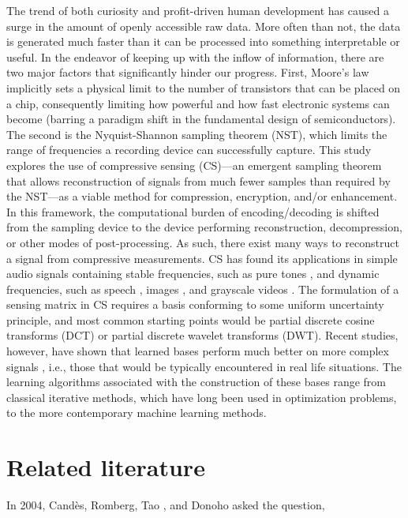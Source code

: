 The trend of both curiosity and profit-driven human development has caused a surge in the amount of openly accessible raw data. More often than not, the data is generated much faster than it can be processed into something interpretable or useful. In the endeavor of keeping up with the inflow of information, there are two major factors that significantly hinder our progress. First, Moore's law implicitly sets a physical limit to the number of transistors that can be placed on a chip, consequently limiting how powerful and how fast electronic systems can become (barring a paradigm shift in the fundamental design of semiconductors). The second is the Nyquist-Shannon sampling theorem (NST), which limits the range of frequencies a recording device can successfully capture. This study explores the use of compressive sensing (CS)---an emergent sampling theorem that allows reconstruction of signals from much fewer samples than required by the NST---as a viable method for compression, encryption, and/or enhancement. In this framework, the computational burden of encoding/decoding is shifted from the sampling device to the device performing reconstruction, decompression, or other modes of post-processing. As such, there exist many ways to reconstruct a signal from compressive measurements. CS has found its applications in simple audio signals containing stable frequencies, such as pure tones \cite{Mathew2016,Andras2018}, and dynamic frequencies, such as speech \cite{Low2013,Low2018,Abrol2015}, images \cite{Mo2013,Zhou2016,Romero2016}, and grayscale videos \cite{Liu2014,Chen2014}. The formulation of a sensing matrix in CS requires a basis conforming to some uniform uncertainty principle, and most common starting points would be partial discrete cosine transforms (DCT) or partial discrete wavelet transforms (DWT). Recent studies, however, have shown that learned bases perform much better on more complex signals \cite{Liu2013,Sharma2018,Eslahi2016}, i.e., those that would be typically encountered in real life situations. The learning algorithms associated with the construction of these bases range from classical iterative methods, which have long been used in optimization problems, to the more contemporary machine learning methods.


\section{Related literature}
\label{sec:rrl}
In 2004, Cand\`{e}s, Romberg, Tao \cite{Candes2006}, and Donoho \cite{Donoho2006} asked the question, 

